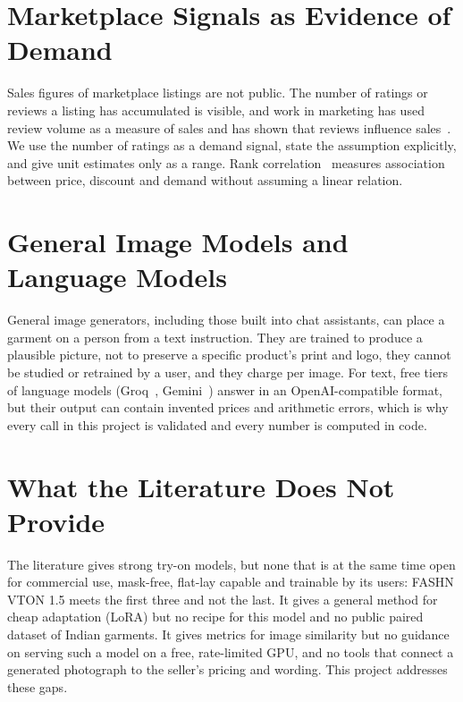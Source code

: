 \section{Marketplace Signals as Evidence of Demand}

Sales figures of marketplace listings are not public. The number of ratings or reviews a listing has accumulated is visible, and work in marketing has used review volume as a measure of sales and has shown that reviews influence sales~\cite{wom}. We use the number of ratings as a demand signal, state the assumption explicitly, and give unit estimates only as a range. Rank correlation~\cite{spearman} measures association between price, discount and demand without assuming a linear relation.

\section{General Image Models and Language Models}

General image generators, including those built into chat assistants, can place a garment on a person from a text instruction. They are trained to produce a plausible picture, not to preserve a specific product's print and logo, they cannot be studied or retrained by a user, and they charge per image. For text, free tiers of language models (Groq~\cite{groq}, Gemini~\cite{gemini}) answer in an OpenAI-compatible format, but their output can contain invented prices and arithmetic errors, which is why every call in this project is validated and every number is computed in code.

\section{What the Literature Does Not Provide}

The literature gives strong try-on models, but none that is at the same time open for commercial use, mask-free, flat-lay capable and trainable by its users: FASHN VTON 1.5 meets the first three and not the last. It gives a general method for cheap adaptation (LoRA) but no recipe for this model and no public paired dataset of Indian garments. It gives metrics for image similarity but no guidance on serving such a model on a free, rate-limited GPU, and no tools that connect a generated photograph to the seller's pricing and wording. This project addresses these gaps.
